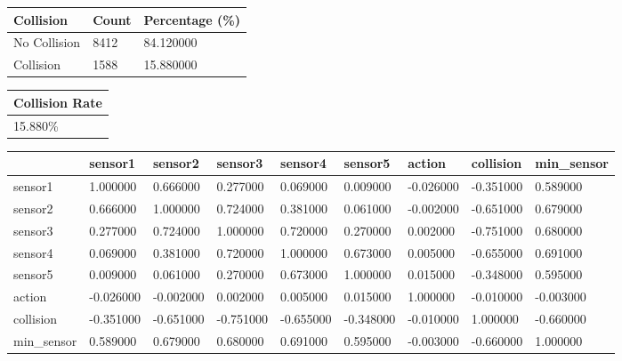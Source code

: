 \bigskip

\bigskip\noindent
\begin{tabular}{p{}p{}p{}}
\toprule
Collision & Count & Percentage (\%) \\
\hline
No Collision & 8412 & 84.120000 \\
Collision & 1588 & 15.880000 \\
\bottomrule
\end{tabular}

\bigskip

\bigskip\noindent
\begin{tabular}{p{\dimexpr \linewidth-2\tabcolsep}}
\toprule
Collision Rate \\
\hline
15.880\% \\
\bottomrule
\end{tabular}

\bigskip

\bigskip\noindent
\begin{tabular}{p{}p{}p{}p{}p{}p{}p{}p{}p{}}
\toprule
~ & sensor1 & sensor2 & sensor3 & sensor4 & sensor5 & action & collision & min\_sensor \\
\hline
sensor1 & 1.000000 & 0.666000 & 0.277000 & 0.069000 & 0.009000 & -0.026000 & -0.351000 & 0.589000 \\
\hline
sensor2 & 0.666000 & 1.000000 & 0.724000 & 0.381000 & 0.061000 & -0.002000 & -0.651000 & 0.679000 \\
\hline
sensor3 & 0.277000 & 0.724000 & 1.000000 & 0.720000 & 0.270000 & 0.002000 & -0.751000 & 0.680000 \\
\hline
sensor4 & 0.069000 & 0.381000 & 0.720000 & 1.000000 & 0.673000 & 0.005000 & -0.655000 & 0.691000 \\
\hline
sensor5 & 0.009000 & 0.061000 & 0.270000 & 0.673000 & 1.000000 & 0.015000 & -0.348000 & 0.595000 \\
\hline
action & -0.026000 & -0.002000 & 0.002000 & 0.005000 & 0.015000 & 1.000000 & -0.010000 & -0.003000 \\
\hline
collision & -0.351000 & -0.651000 & -0.751000 & -0.655000 & -0.348000 & -0.010000 & 1.000000 & -0.660000 \\
\hline
min\_sensor & 0.589000 & 0.679000 & 0.680000 & 0.691000 & 0.595000 & -0.003000 & -0.660000 & 1.000000 \\
\hline
\bottomrule
\end{tabular}

